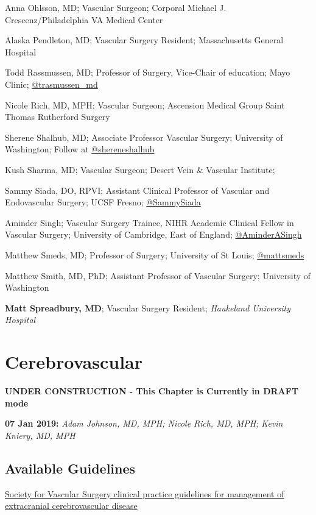 \documentclass[
]{book}
\begin{document}
Anna Ohlsson, MD; Vascular Surgeon; Corporal Michael J. Crescenz/Philadelphia VA Medical Center

Alaska Pendleton, MD; Vascular Surgery Resident; Massachusetts General Hospital

Todd Rassmussen, MD; Professor of Surgery, Vice-Chair of education; Mayo Clinic; \href{https://mobile.twitter.com/trasmussen_md}{@trasmussen\_md}

Nicole Rich, MD, MPH; Vascular Surgeon; Ascension Medical Group Saint Thomas Rutherford Surgery

Sherene Shalhub, MD; Associate Professor Vascular Surgery; University of Washington; Follow at \href{https://twitter.com/shereneshalhub}{@shereneshalhub}

Kush Sharma, MD; Vascular Surgeon; Desert Vein \& Vascular Institute;

Sammy Siada, DO, RPVI; Assistant Clinical Professor of Vascular and Endovascular Surgery; UCSF Fresno; \href{https://twitter.com/sammysiada}{@SammySiada}

Aminder Singh; Vascular Surgery Trainee, NIHR Academic Clinical Fellow in Vascular Surgery; University of Cambridge, East of England; \href{https://twitter.com/aminderasingh}{@AminderASingh}

Matthew Smeds, MD; Professor of Surgery; University of St Louis; \href{https://twitter.com/mattsmeds?lang=en}{@mattsmeds}

Matthew Smith, MD, PhD; Assistant Professor of Vascular Surgery; University of Washington

\textbf{Matt Spreadbury, MD}; Vascular Surgery Resident; \emph{Haukeland University Hospital}

\hypertarget{cerebrovascular}{%
\chapter{Cerebrovascular}\label{cerebrovascular}}

\textbf{UNDER CONSTRUCTION - This Chapter is Currently in DRAFT mode}

\textbf{07 Jan 2019:} \emph{Adam Johnson, MD, MPH; Nicole Rich, MD, MPH; Kevin
Kniery, MD, MPH}

\hypertarget{available-guidelines}{%
\section{Available Guidelines}\label{available-guidelines}}

\href{https://www.jvascsurg.org/article/S0741-5214(21)00893-4/fulltext}{Society for Vascular Surgery clinical practice guidelines for
management of extracranial cerebrovascular
disease}
\citep{aburahmaSocietyVascularSurgery2022}
\end{document}
